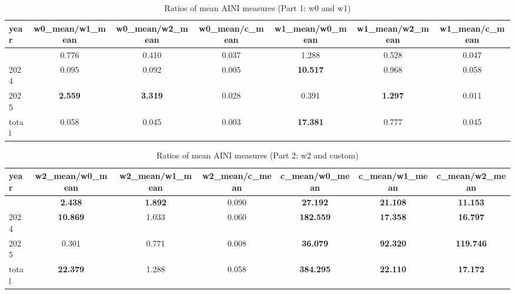 
\begin{table}[!htbp]
\centering
\caption{Ratios of mean AINI measures (Part 1: w0 and w1)}
\begin{adjustbox}{width=\textwidth}
\begin{tabular}{lcccccc}
\toprule
\addlinespace
year & w0\_mean/w1\_mean & w0\_mean/w2\_mean & w0\_mean/c\_mean & w1\_mean/w0\_mean & w1\_mean/w2\_mean & w1\_mean/c\_mean \\
\midrule
\addlinespace
2023 & 0.776 & 0.410 & 0.037 & 1.288 & 0.528 & 0.047 \\
2024 & 0.095 & 0.092 & 0.005 & \textbf{10.517} & 0.968 & 0.058 \\
2025 & \textbf{2.559} & \textbf{3.319} & 0.028 & 0.391 & \textbf{1.297} & 0.011 \\
total & 0.058 & 0.045 & 0.003 & \textbf{17.381} & 0.777 & 0.045 \\
\bottomrule
\end{tabular}
\end{adjustbox}
\end{table}

\begin{table}[!htbp]
\centering
\caption{Ratios of mean AINI measures (Part 2: w2 and custom)}
\begin{adjustbox}{width=\textwidth}
\begin{tabular}{lcccccc}
\toprule
\addlinespace
year & w2\_mean/w0\_mean & w2\_mean/w1\_mean & w2\_mean/c\_mean & c\_mean/w0\_mean & c\_mean/w1\_mean & c\_mean/w2\_mean \\
\midrule
\addlinespace
2023 & \textbf{2.438} & \textbf{1.892} & 0.090 & \textbf{27.192} & \textbf{21.108} & \textbf{11.153} \\
2024 & \textbf{10.869} & 1.033 & 0.060 & \textbf{182.559} & \textbf{17.358} & \textbf{16.797} \\
2025 & 0.301 & 0.771 & 0.008 & \textbf{36.079} & \textbf{92.320} & \textbf{119.746} \\
total & \textbf{22.379} & 1.288 & 0.058 & \textbf{384.295} & \textbf{22.110} & \textbf{17.172} \\
\bottomrule
\end{tabular}
\end{adjustbox}
\end{table}
